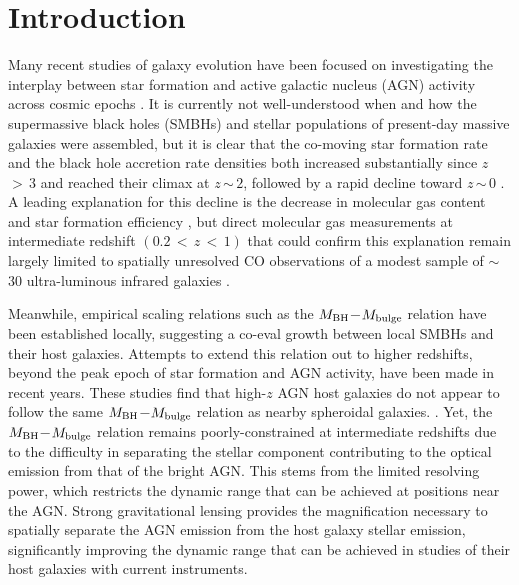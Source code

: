 \documentclass[]{emulateapj}
\newcommand{\mbulge}{\mbox{$M_{\rm bulge}$}\xspace}
\newcommand{\ssim}{\,$\sim$\,}
\newcommand{\eg}{{e.g.,~}}
\newcommand{\SF}{star formation\xspace}
\begin{document}
\section{Introduction}
Many recent studies of galaxy evolution have been focused on investigating the interplay between star formation and active galactic nucleus (AGN) activity across cosmic epochs \citep[e.g.,][]{DiMatteo05a,Alexander05a,Hopkins06b,Coppin08a,Page12a,Simpson12a,Lamastra13a}.
It is currently not well-understood when and how the supermassive black holes (SMBHs) and
stellar populations of present-day massive galaxies were assembled,
but it is clear that the co-moving \SF rate and the black hole accretion rate densities both
increased substantially since $z$\,$>\,3$ and reached their climax at $z$\ssim$2$, followed by
a rapid decline toward $z$\ssim$0$ \citep[\eg][]{Hopkins06a, Madau14a}.
A leading explanation for this decline is the decrease in molecular gas content and
\SF efficiency \citep[e.g.,][]{Erb06a, CW13, Walter14a},
but direct molecular gas measurements at intermediate redshift
$(0.2\,<\,z\,<\,1)$ that could confirm this explanation remain largely limited to
spatially unresolved CO observations of
a modest sample of $\sim$$30$ ultra-luminous infrared galaxies \citep[ULIRGs; ][]{Combes11a, Combes13a}.

Meanwhile, empirical scaling relations such as the
$M_{\rm BH}$$-$\mbulge relation \citep[e.g.,][]{Magorrian98a, HR04a}
have been established locally, suggesting a co-eval growth between local SMBHs and their host galaxies.
Attempts to extend this relation out to higher redshifts, beyond the peak epoch
of \SF and AGN activity, have been made in recent years.
These studies find that
high-$z$ AGN host galaxies do not appear to follow the same $M_{\rm BH}$$-$\mbulge relation as nearby spheroidal galaxies. \citep[\eg][]{Walter04a,Borys05a, McLure06a,Peng06a, Riechers08a,Coppin08a,Alexander08a}.
Yet, the $M_{\rm BH}$$-$\mbulge relation remains poorly-constrained
at intermediate redshifts due to the difficulty
in separating the stellar component contributing to the optical emission from that of the bright AGN.
This stems from the limited resolving power, which restricts the dynamic range that can be achieved at positions near the AGN.
Strong gravitational lensing provides the magnification necessary to spatially separate the AGN emission from the host galaxy stellar emission, significantly improving the dynamic range that can be achieved in studies of their host galaxies with current instruments.
\end{document}

